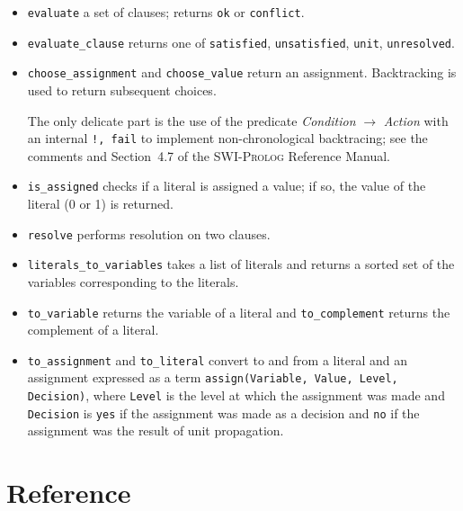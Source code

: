 \documentclass[11pt]{article}
\newcommand*{\p}[1]{\textup{\texttt{#1}}}
\newcommand*{\sw}{\textsc{SWI-Prolog}}
\begin{document}
\begin{itemize}

\item \p{evaluate} a set of clauses; returns \p{ok} or \p{conflict}.

\item \p{evaluate\_clause} returns one of \p{satisfied}, \p{unsatisfied},
\p{unit}, \p{unresolved}.

\item \p{choose\_assignment} and \p{choose\_value} return an assignment.
Backtracking is used to return subsequent choices.

The only delicate part is the use of the predicate \emph{Condition}
$\rightarrow$ \emph{Action} with an internal \p{!, fail} to implement
non-chronological backtracing; see the comments and Section~4.7 of the
\sw{} Reference Manual.

\item \p{is\_assigned} checks if a literal is assigned a value; if so,
the value of the literal (0 or 1) is returned.

\item \p{resolve} performs resolution on two clauses.

\item \p{literals\_to\_variables} takes a list of literals and returns a
sorted set of the variables corresponding to the literals.

\item \p{to\_variable} returns the variable of a literal and
\p{to\_complement} returns the complement of a literal.

\item \p{to\_assignment} and \p{to\_literal} convert to and from a
literal and an assignment expressed as a term \p{assign(Variable, Value,
Level, Decision)}, where \p{Level} is the level at which the assignment
was made and \p{Decision} is \p{yes} if the assignment was
made as a decision and \p{no} if the assignment was the result of unit
propagation.

\end{itemize}





\newpage

\appendix
\section{Reference}

\bigskip\bigskip
\end{document}
